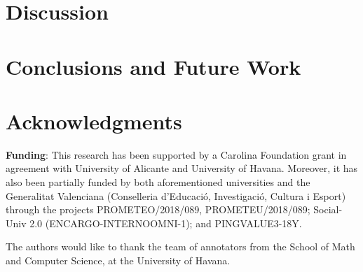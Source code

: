 \documentclass[11pt,a4paper]{article}
\begin{document}

\section{Discussion}

\section{Conclusions and Future Work}

\section*{Acknowledgments}


\textbf{Funding}: This research has been supported by a Carolina Foundation grant in agreement with University of Alicante and University of Havana. Moreover, it has also been partially funded by both aforementioned universities and the Generalitat Valenciana (Conselleria d’Educació, Investigació, Cultura i Esport) through the projects PROMETEO/2018/089, PROMETEU/2018/089;  Social-Univ 2.0 (ENCARGO-INTERNOOMNI-1); and PINGVALUE3-18Y.

The authors would like to thank the team of annotators from the School of Math and Computer Science, at the University of Havana.





\appendix
\end{document}
